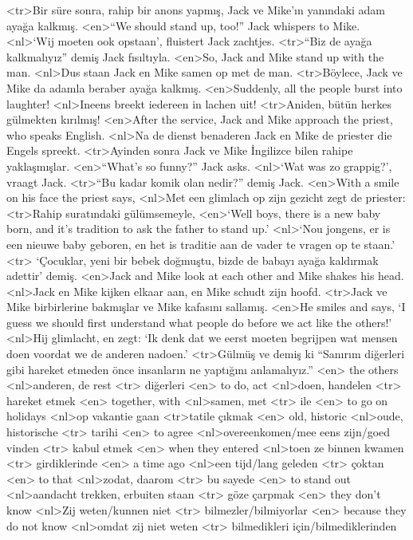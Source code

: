 <tr>Bir süre sonra, rahip bir anons yapmış, Jack ve Mike'ın yanındaki adam ayağa kalkmış. 
<en>“We should stand up, too!” Jack whispers to Mike.
<nl>`Wij moeten ook opstaan', fluistert Jack zachtjes.
<tr>“Biz de ayağa kalkmalıyız” demiş Jack fısıltıyla.
<en>So, Jack and Mike stand up with the man. 
<nl>Dus staan Jack en Mike samen op met de man. 
<tr>Böylece, Jack ve Mike da adamla beraber ayağa kalkmış. 
<en>Suddenly, all the people burst into laughter!
<nl>Ineens breekt iedereen in  lachen uit!
<tr>Aniden, bütün herkes gülmekten kırılmış!
<en>After the service, Jack and Mike approach the priest, who speaks English.
<nl>Na de dienst benaderen Jack en Mike de priester die Engels spreekt.
<tr>Ayinden sonra Jack ve Mike İngilizce bilen  rahipe yaklaşmışlar.
<en>“What’s so funny?” Jack asks.
<nl>`Wat was zo grappig?', vraagt Jack.
<tr>“Bu kadar komik olan nedir?” demiş Jack.
<en>With a smile on his face the priest says, 
<nl>Met een glimlach op zijn gezicht zegt de priester: 
<tr>Rahip suratındaki gülümsemeyle,
<en>`Well boys, there is a new baby born, and it’s tradition  to ask the father to stand up.'
<nl>`Nou jongens, er is een nieuwe baby geboren, en het is traditie  aan de vader te vragen op te staan.'
<tr> `Çocuklar, yeni bir bebek doğmuştu, bizde de babayı ayağa kaldırmak adettir' demiş.
<en>Jack and Mike look at each other and Mike shakes his head. 
<nl>Jack en Mike kijken elkaar aan, en Mike schudt zijn hoofd. 
<tr>Jack ve Mike birbirlerine bakmışlar ve Mike kafasını sallamış. 
<en>He smiles and says, `I guess we should first understand what people do before we act like the others!'
<nl>Hij glimlacht, en zegt: `Ik denk dat we eerst moeten begrijpen wat mensen doen voordat we de anderen nadoen.'
<tr>Gülmüş ve demiş ki “Sanırım diğerleri gibi hareket etmeden önce insanların ne yaptığını anlamalıyız.”
<en> the others 
<nl>anderen, de rest  
<tr> diğerleri
<en> to do, act 
<nl>doen, handelen 
<tr> hareket etmek 
<en> together, with 
<nl>samen, met 
<tr> ile 
<en> to go on holidays 
<nl>op vakantie gaan
<tr>tatile çıkmak
<en> old, historic 
<nl>oude,  historische 
<tr> tarihi 
<en> to agree 
<nl>overeenkomen/mee eens zijn/goed vinden  
<tr> kabul etmek  
<en> when they entered 
<nl>toen ze binnen kwamen 
<tr> girdiklerinde  
<en> a time ago 
<nl>een tijd/lang geleden 
<tr> çoktan 
<en> to that 
<nl>zodat, daarom 
<tr> bu sayede
<en> to stand out 
<nl>aandacht trekken, erbuiten staan 
<tr> göze çarpmak 
<en> they don't know 
<nl>Zij weten/kunnen niet  
<tr> bilmezler/bilmiyorlar 
<en> because they do not know 
<nl>omdat zij niet weten 
<tr> bilmedikleri için/bilmediklerinden 
